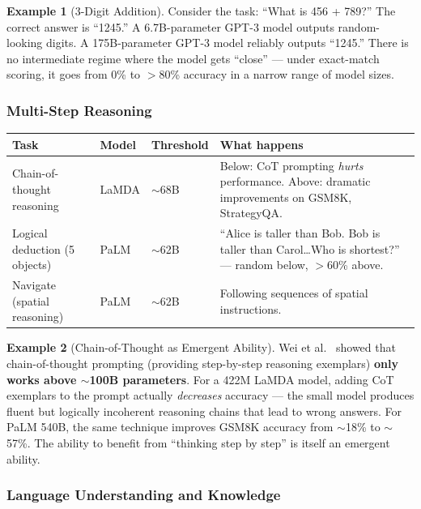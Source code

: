 \documentclass[11pt, a4paper]{article}
\theoremstyle{definition}
\newtheorem{example}{Example}[section]
\theoremstyle{plain}
\begin{document}
\begin{example}[3-Digit Addition]
Consider the task: ``What is 456 + 789?'' The correct answer is ``1245.'' A 6.7B-parameter GPT-3 model outputs random-looking digits. A 175B-parameter GPT-3 model reliably outputs ``1245.'' There is no intermediate regime where the model gets ``close'' --- under exact-match scoring, it goes from 0\% to $>$80\% accuracy in a narrow range of model sizes.
\end{example}

\subsubsection{Multi-Step Reasoning}

\begin{center}
\begin{tabular}{p{4cm}llp{5cm}}
  \toprule
  \textbf{Task} & \textbf{Model} & \textbf{Threshold} & \textbf{What happens} \\
  \midrule
  Chain-of-thought reasoning & LaMDA & ${\sim}$68B & Below: CoT prompting \emph{hurts} performance. Above: dramatic improvements on GSM8K, StrategyQA. \\[0.5em]
  Logical deduction (5 objects) & PaLM & ${\sim}$62B & ``Alice is taller than Bob. Bob is taller than Carol\ldots Who is shortest?'' --- random below, $>$60\% above. \\[0.5em]
  Navigate (spatial reasoning) & PaLM & ${\sim}$62B & Following sequences of spatial instructions. \\
  \bottomrule
\end{tabular}
\end{center}

\begin{example}[Chain-of-Thought as Emergent Ability]
Wei et al.~\cite{wei2022cot} showed that chain-of-thought prompting (providing step-by-step reasoning exemplars) \textbf{only works above ${\sim}$100B parameters}. For a 422M LaMDA model, adding CoT exemplars to the prompt actually \emph{decreases} accuracy --- the small model produces fluent but logically incoherent reasoning chains that lead to wrong answers. For PaLM 540B, the same technique improves GSM8K accuracy from ${\sim}$18\% to ${\sim}$57\%. The ability to benefit from ``thinking step by step'' is itself an emergent ability.
\end{example}

\subsubsection{Language Understanding and Knowledge}
\end{document}
